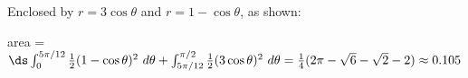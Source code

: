 {Enclosed by $r=3\cos\theta$ and $r=1-\cos\theta$, as shown:

}
{area = $\ds \int_{0}^{5\pi/12} \frac12 (1-\cos\theta)^2\ d\theta +\int_{5\pi/12}^{\pi/2} \frac12 (3\cos\theta)^2\ d\theta =\frac14(2\pi-\sqrt{6}-\sqrt{2}-2)\approx 0.105$}
